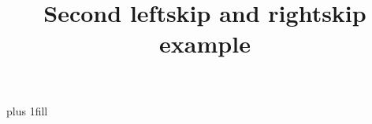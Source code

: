\documentclass{article}
\title{Second leftskip and rightskip example}
\begin{document}
	
	\mytextB
	
	\leftskip 10pt
	\rightskip 0pt plus 1fill
	\vspace{8pt}
	
	\mytextB
	
\end{document}
